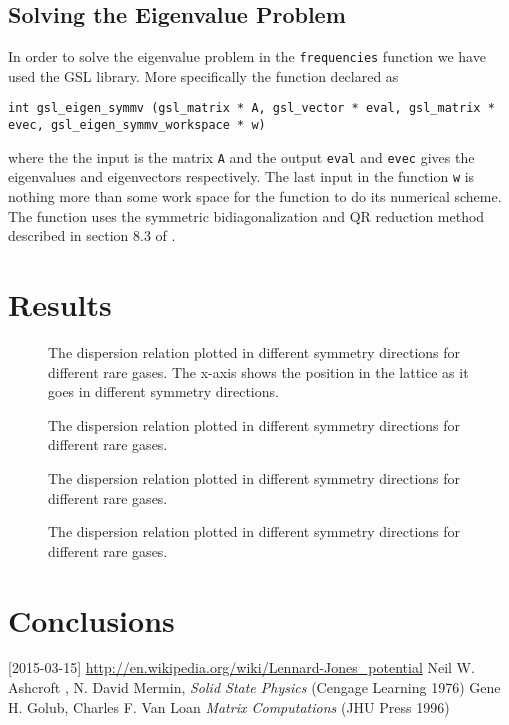 \documentclass[11pt]{article}
\begin{document}
\subsection{Solving the Eigenvalue Problem}
In order to solve the eigenvalue problem in the \verb+frequencies+ function we have used the GSL library. More specifically the function declared as
\begin{lstlisting}
int gsl_eigen_symmv (gsl_matrix * A, gsl_vector * eval, gsl_matrix * evec, gsl_eigen_symmv_workspace * w)
\end{lstlisting}
where the the input is the matrix \verb+A+ and the output \verb+eval+ and \verb+evec+ gives the eigenvalues and eigenvectors respectively. The last input in the function \verb+w+ is nothing more than some work space for the function to do its numerical scheme. The function uses the symmetric bidiagonalization and QR reduction method described in section 8.3 of \cite{bib:num}.

\newpage
\section{Results}
\begin{figure}[H]
	\centering
	\newlength\figureheight 
	\newlength\figurewidth 
	\setlength\figureheight{15cm} 
	\setlength\figurewidth{15cm}
	
	\caption{The dispersion relation plotted in different symmetry directions for different rare gases. The x-axis shows the position in the lattice as it goes in different symmetry directions.}
	\label{fig:Freq}
\end{figure}
\newpage
\begin{figure}[H]
	\centering
	\setlength\figureheight{18cm} 
	\setlength\figurewidth{14cm}
	
	\caption{The dispersion relation plotted in different symmetry directions for different rare gases.}
	\label{fig:VolDep}
\end{figure}
\newpage
\begin{figure}[H]
	\centering
	\setlength\figureheight{8cm} 
	\setlength\figurewidth{14cm}
	
	\caption{The dispersion relation plotted in different symmetry directions for different rare gases.}
	\label{fig:Ne440}
\end{figure}
\newpage
\begin{figure}[H]
	\centering
	\setlength\figureheight{16cm} 
	\setlength\figurewidth{14cm}
	
	\caption{The dispersion relation plotted in different symmetry directions for different rare gases.}
	\label{fig:Cv}
\end{figure}



\section{Conclusions}
\begin{thebibliography}{99}
 [2015-03-15] \url{http://en.wikipedia.org/wiki/Lennard-Jones_potential}
 Neil W. Ashcroft , N. David Mermin, \textit{Solid State Physics} (Cengage Learning 1976)
 Gene H. Golub, Charles F. Van Loan \textit{Matrix Computations} (JHU Press 1996)
\end{thebibliography}
\end{document}
